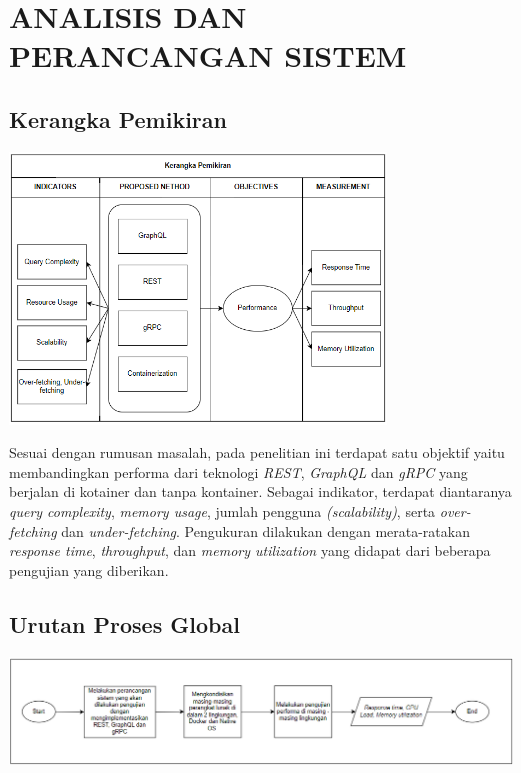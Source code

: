 \chapter{ANALISIS DAN PERANCANGAN SISTEM}
\vspace{4.5pt}
\section{Kerangka Pemikiran}
\begin{center}
	\includegraphics[width=10cm]{img/kerangka pemikiran.png}
	\label{fig:asd}
\end{center}
Sesuai dengan rumusan masalah, pada penelitian ini terdapat satu objektif yaitu membandingkan performa  dari teknologi \textit{REST}, \textit{GraphQL} dan \textit{gRPC} yang berjalan di kotainer dan tanpa kontainer. Sebagai indikator, terdapat diantaranya \textit{query complexity}, \textit{memory usage}, jumlah pengguna \textit{(scalability)}, serta \textit{over-fetching} dan \textit{under-fetching}. Pengukuran dilakukan dengan merata-ratakan \textit{response time}, \textit{throughput}, dan \textit{memory utilization}   yang didapat dari beberapa pengujian yang diberikan.\\


\section{Urutan Proses Global}
\begin{center}
	\includegraphics[width=15cm]{img/proses global.png}
	\label{fig:asd}
\end{center}